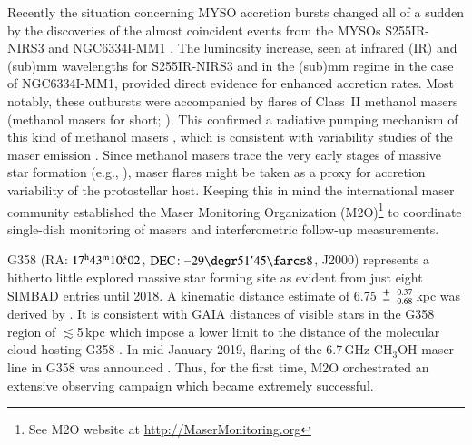 Recently the situation concerning MYSO accretion bursts changed all of a sudden by the discoveries of the almost coincident events from the MYSOs S255IR-NIRS3 \citep{2016ATel.8732....1S, 2017NatPh..13..276C, 2018ApJ...863L..12L} and NGC6334I-MM1 \citep{2017ApJ...837L..29H, 2018ApJ...854..170H}. The luminosity increase, seen at infrared (IR) and (sub)mm wavelengths for S255IR-NIRS3 and
in the (sub)mm regime in the case of NGC6334I-MM1, provided direct evidence for enhanced accretion rates. Most notably, these outbursts were accompanied by flares of Class~II methanol masers (methanol masers for short; \citealp{2015ATel.8286....1F,2018A&A...617A..80S, 2018MNRAS.478.1077M}). This confirmed a radiative pumping mechanism of this kind of methanol masers \citep{1991ASPC...16..119M, 1997A&A...324..211S, 2005MNRAS.360..533C}, which is consistent with variability studies of the maser emission \citep{2018MNRAS.474..219S, 2019MNRAS.485..777D}. Since methanol masers trace the very early stages of massive star formation (e.g., \citealp{2013MNRAS.435..524B}), maser flares might be taken as a proxy for accretion variability of the protostellar host. Keeping this in mind the international maser community established the Maser Monitoring Organization (M2O)\footnote{See M2O website at \url{http://MaserMonitoring.org}} to coordinate single-dish monitoring of masers and interferometric follow-up measurements.

G358 (RA: $\rm 17^h 43^m 10
.\!^s02{}$, $\rm {DEC\!:~} {-}29\degr 51' 45\farcs8$, J2000) represents a hitherto little explored massive star forming site as evident from just eight SIMBAD entries until 2018. A kinematic distance estimate of 6.75$\,{\mypm}\,^{\,0.37}_{\,0.68}$\,kpc was derived by \citet{2019ApJ...881L..39B}. It is consistent with GAIA distances of visible stars in the G358 region of $\lesssim$5\,kpc
which impose a lower limit to the distance of the molecular cloud hosting G358
\citep{2020NatAs...4..506B}.
In mid-January 2019, flaring of the 6.7\,GHz CH$_3$OH maser line \citep{1991ApJ...380L..75M} in G358 was announced \citep{2019ATel12446....1S}. Thus, for the first time, M2O orchestrated an extensive observing campaign which became extremely successful. 

